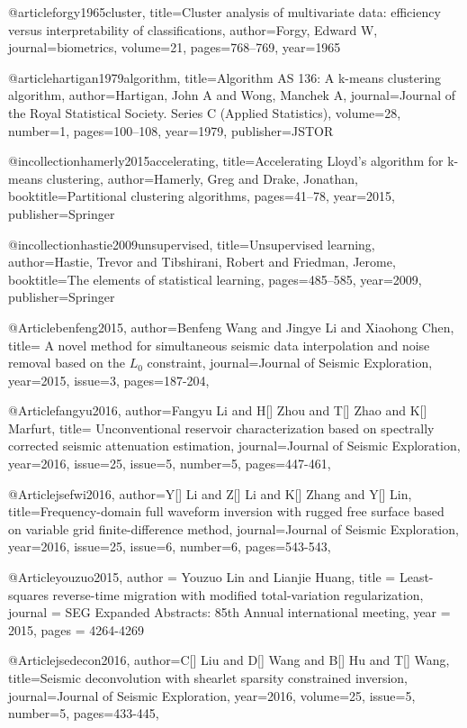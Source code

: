 @article{forgy1965cluster,
  title={Cluster analysis of multivariate data: efficiency versus interpretability of classifications},
  author={Forgy, Edward W},
  journal={biometrics},
  volume={21},
  pages={768--769},
  year={1965}
}

@article{hartigan1979algorithm,
  title={Algorithm AS 136: A k-means clustering algorithm},
  author={Hartigan, John A and Wong, Manchek A},
  journal={Journal of the Royal Statistical Society. Series C (Applied Statistics)},
  volume={28},
  number={1},
  pages={100--108},
  year={1979},
  publisher={JSTOR}
}

@incollection{hamerly2015accelerating,
  title={Accelerating Lloyd’s algorithm for k-means clustering},
  author={Hamerly, Greg and Drake, Jonathan},
  booktitle={Partitional clustering algorithms},
  pages={41--78},
  year={2015},
  publisher={Springer}
}

@incollection{hastie2009unsupervised,
  title={Unsupervised learning},
  author={Hastie, Trevor and Tibshirani, Robert and Friedman, Jerome},
  booktitle={The elements of statistical learning},
  pages={485--585},
  year={2009},
  publisher={Springer}
}

@Article{benfeng2015,
  author={Benfeng Wang and Jingye Li and Xiaohong Chen},
  title={ A novel method for simultaneous seismic data interpolation and noise removal based on the $L_0$ constraint},
  journal={Journal of Seismic Exploration},
  year=2015,
  issue=3,
  pages={187-204},
}

@Article{fangyu2016,
  author={Fangyu Li and H[] Zhou and T[] Zhao and K[] Marfurt},
  title={ Unconventional reservoir characterization based on spectrally corrected seismic attenuation estimation},
  journal={Journal of Seismic Exploration},
  year=2016,
  issue=25,
  issue=5,
  number=5,
  pages={447-461},
}

@Article{jsefwi2016,
  author={Y[] Li and Z[] Li and K[] Zhang and Y[] Lin},
  title={Frequency-domain full waveform inversion with rugged free surface based on variable grid finite-difference method},
  journal={Journal of Seismic Exploration},
  year=2016,
  issue=25,
  issue=6,
  number=6,
  pages={543-543},
}

@Article{youzuo2015,
  author = 	 {Youzuo Lin and Lianjie Huang},
  title = 	 {Least-squares reverse-time migration with modified total-variation regularization},
  journal = 	 {SEG Expanded Abstracts: 85th Annual international meeting},
  year = 	 2015,
  pages =	 {4264-4269}
}


@Article{jsedecon2016,
  author={C[] Liu and D[] Wang and B[] Hu and T[] Wang},
  title={Seismic deconvolution with shearlet sparsity constrained inversion},
  journal={Journal of Seismic Exploration},
  year=2016,
  volume=25,
  issue=5,
  number=5,
  pages={433-445},
}


